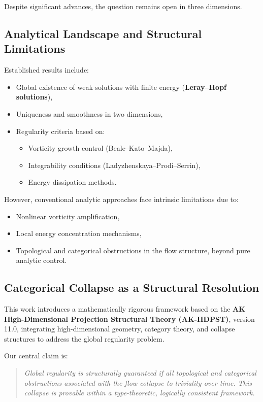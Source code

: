 \documentclass[11pt]{article}
\begin{document}
Despite significant advances, the question remains open in three dimensions.

\subsection{Analytical Landscape and Structural Limitations}

Established results include:
\begin{itemize}
  \item Global existence of weak solutions with finite energy (\textbf{Leray–Hopf solutions}),
  \item Uniqueness and smoothness in two dimensions,
  \item Regularity criteria based on:
    \begin{itemize}
      \item Vorticity growth control (Beale–Kato–Majda),
      \item Integrability conditions (Ladyzhenskaya–Prodi–Serrin),
      \item Energy dissipation methods.
    \end{itemize}
\end{itemize}

However, conventional analytic approaches face intrinsic limitations due to:
\begin{itemize}
  \item Nonlinear vorticity amplification,
  \item Local energy concentration mechanisms,
  \item Topological and categorical obstructions in the flow structure, beyond pure analytic control.
\end{itemize}

\subsection{Categorical Collapse as a Structural Resolution}

This work introduces a mathematically rigorous framework based on the \textbf{AK High-Dimensional Projection Structural Theory (AK-HDPST)}, version 11.0, integrating high-dimensional geometry, category theory, and collapse structures to address the global regularity problem.

Our central claim is:

\begin{quote}
\textit{Global regularity is structurally guaranteed if all topological and categorical obstructions associated with the flow collapse to triviality over time. This collapse is provable within a type-theoretic, logically consistent framework.}
\end{quote}
\end{document}
